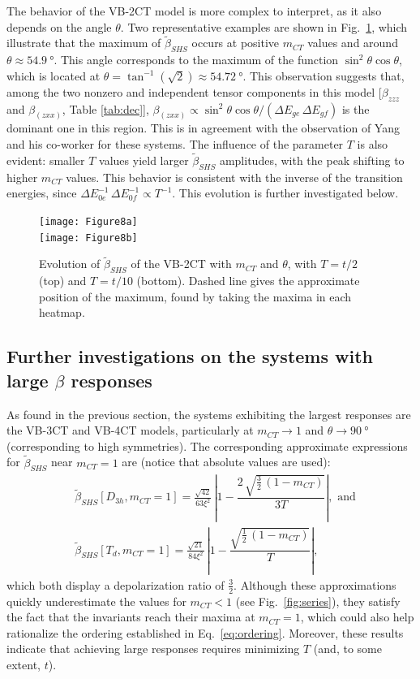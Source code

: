 \documentclass[USenglish]{article}
\begin{document}
The behavior of the VB-2CT model is more complex to interpret, as it also depends on the angle $\theta$. Two representative examples are shown in Fig.~\ref{fig:3sttheta}, which illustrate that the maximum of $\tilde\beta_{SHS}$ occurs at positive $m_{CT}$ values and around $\theta \approx \SI{54.9}{\degree}$. This angle corresponds to the maximum of the function $\sin^2\theta\cos\theta$, which is located at $\theta = \tan^{-1}(\sqrt{2}) \approx \SI{54.72}{\degree}$. This observation suggests that, among the two nonzero and independent tensor components in this model [$\beta_{zzz}$ and $\beta_{(zxx)}$, Table \ref{tab:dec}], $\beta_{(zxx)} \propto \sin^2\theta\cos\theta / (\Delta E_{ge}\,\Delta E_{gf})$ is the dominant one in this region.  This is in agreement with the observation of Yang and his co-worker \cite{yangLargeOffDiagonalContribution2003} for these systems.
The influence of the parameter $T$ is also evident: smaller $T$ values yield larger $\tilde\beta_{SHS}$ amplitudes, with the peak shifting to higher $m_{CT}$ values. This behavior is consistent with the inverse of the transition energies, since $\Delta E_{0e}^{-1}\,\Delta E_{0f}^{-1} \propto T^{-1}$. This evolution is further investigated below.


\begin{figure}[!h]
	\texttt{[image: Figure8a]}\\
	\texttt{[image: Figure8b]}
	\caption{Evolution of $\tilde\beta_{SHS}$  of the VB-2CT with $m_{CT}$ and $\theta$, with $T=t/2$ (top) and $T=t/10$ (bottom). Dashed line gives the approximate position of the maximum, found by taking the maxima in each heatmap.}
	\label{fig:3sttheta}
\end{figure}

\clearpage
\subsection{Further investigations on the systems with large $\beta$ responses}

As found in the previous section, the systems exhibiting the largest responses are the VB-3CT and VB-4CT models, particularly at $m_{CT} \to 1$ and $\theta \to \SI{90}{\degree}$ (corresponding to high symmetries). The corresponding approximate expressions for $\tilde\beta_{SHS}$ near $m_{CT} = 1$ are (notice that absolute values are used):\begin{align}
	&\tilde\beta_{SHS}[D_{3h}, m_{CT}=1] = \frac{\sqrt{42}}{63\xi^2}\,\left|1-\dfrac{2\,\sqrt{\frac{3}{2}\,(1-m_{CT})}}{3T}\right|, \text{ and}\label{eq:highsym4}\\ &\tilde\beta_{SHS}[T_d, m_{CT}=1]  = \frac{\sqrt{21}}{84\xi^2}\,\left|1-\dfrac{\sqrt{\frac{1}{2}\,(1-m_{CT})}}{T}\right|,\label{eq:highsym5}
\end{align}
which both display a depolarization ratio of $\frac{3}{2}$.
Although these approximations quickly underestimate the values for $m_{CT} < 1$ (see Fig.~\ref{fig:series}), they satisfy the fact that the invariants reach their maxima at $m_{CT} = 1$, which could also help rationalize the ordering established in Eq.~\eqref{eq:ordering}. 
Moreover, these results indicate that achieving large responses requires minimizing $T$ (and, to some extent, $t$).
\end{document}

